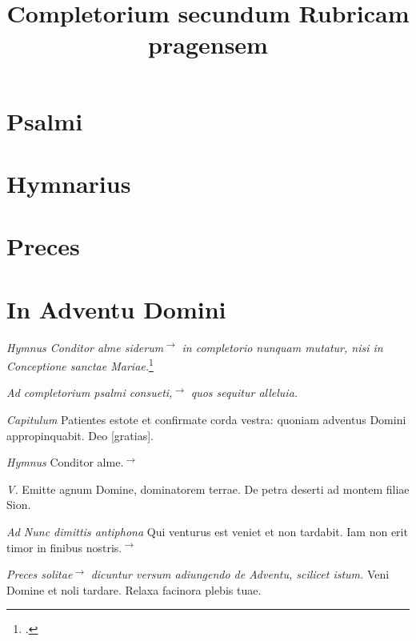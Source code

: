 \documentclass[a5paper, 12pt]{book}
\title{Completorium secundum Rubricam pragensem}
\newcommand{\rubrica}[1]{\textit{#1}}
\newcommand{\incipit}[1]{\textup{#1}}
\newcommand{\hymnus}[1]{%
  \phantomsection
  \label{hym:#1}
  }
\newcommand{\quickref}[1]{\quickrefFormat{\pageref{#1}}}
\newcommand{\quickrefFormat}[1]{\textsuperscript{\textup{$\rightarrow$#1}}}
\newcommand{\editorial}[1]{[#1]}
\begin{document}
\maketitle

\chapter{Psalmi}
\label{psalmi}

\chapter{Hymnarius}

\hymnus{conditor}

\chapter{Preces}
\label{preces}


\chapter{In Adventu Domini}

\rubrica{Hymnus \incipit{Conditor alme siderum}\quickref{hym:conditor}
  in completorio
  nunquam mutatur, nisi in Conceptione sanctae Mariae.}\footcite[83r]{bp1502}
\vspace{3mm}

\rubrica{Ad completorium psalmi consueti,\quickref{psalmi}
  quos sequitur \incipit{alleluia.}}

\rubrica{Capitulum}
Patientes estote et confirmate corda vestra:
quoniam adventus Domini appropinquabit.
Deo \editorial{gratias}.

\rubrica{Hymnus}
Conditor alme.\quickref{hym:conditor}

\rubrica{V.}
Emitte agnum Domine, dominatorem terrae.
De petra deserti ad montem filiae Sion.

\rubrica{Ad Nunc dimittis antiphona}
Qui venturus est veniet et non tardabit. Iam non erit timor in finibus nostris.\quickref{can:adventus_quiventurus}

\rubrica{Preces solitae\quickref{preces}
  dicuntur versum adiungendo de Adventu, scilicet istum.}
Veni Domine et noli tardare. Relaxa facinora plebis tuae.
\end{document}
